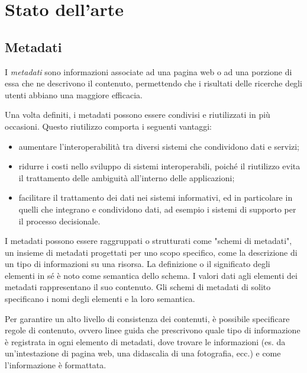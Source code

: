 \clearpage{\pagestyle{empty}\cleardoublepage}
\lhead[\fancyplain{}{\bfseries\thepage}]{\fancyplain{}{\bfseries\rightmark}}
\chapter{Stato dell'arte}
\section{Metadati}
I \textit{metadati} sono informazioni associate ad una pagina web o ad una porzione di essa che ne descrivono il contenuto, permettendo che i risultati delle ricerche degli utenti abbiano una maggiore efficacia.

Una volta definiti, i metadati possono essere condivisi e riutilizzati in più occasioni. Questo riutilizzo comporta i seguenti vantaggi:
\begin{itemize}
\item aumentare l'interoperabilità tra diversi sistemi che condividono dati e servizi;
\item ridurre i costi nello sviluppo di sistemi interoperabili, poiché il riutilizzo evita il trattamento delle ambiguità all'interno delle applicazioni;
\item facilitare il trattamento dei dati nei sistemi informativi, ed in particolare in quelli che integrano e condividono dati, ad esempio i sistemi di supporto per il processo decisionale.
\end{itemize}

I metadati possono essere raggruppati o strutturati come "schemi di metadati", un insieme di metadati progettati per uno scopo specifico, come la descrizione di un tipo di informazioni su una risorsa. La definizione o il significato degli elementi in sé è noto come semantica dello schema. I valori dati agli elementi dei metadati rappresentano il suo contenuto. Gli schemi di metadati di solito specificano i nomi degli elementi e la loro semantica.

Per garantire un alto livello di consistenza dei contenuti, è possibile specificare regole di contenuto, ovvero linee guida che prescrivono quale tipo di informazione è registrata in ogni elemento di metadati, dove trovare le informazioni (es. da un'intestazione di pagina web, una didascalia di una fotografia, ecc.) e come l'informazione è formattata. 

